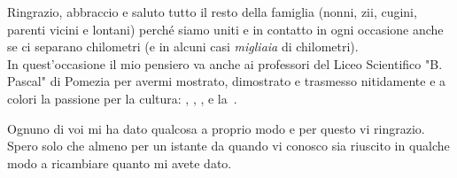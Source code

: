 Ringrazio, abbraccio e saluto tutto il resto della famiglia (nonni, zii, cugini, parenti vicini e lontani) perché siamo uniti e in contatto in ogni occasione anche se ci separano chilometri (e in alcuni casi \emph{migliaia} di chilometri).\\
In quest'occasione il mio pensiero va anche ai professori del Liceo Scientifico "B. Pascal" di Pomezia per avermi mostrato, dimostrato e trasmesso nitidamente e a colori la passione per la cultura: , , ,  e la~.

Ognuno di voi mi ha dato qualcosa a proprio modo e per questo vi ringrazio. Spero solo che almeno per un istante da quando vi conosco sia riuscito in qualche modo a ricambiare quanto mi avete dato.

\newpage
\mbox{}
\thispagestyle{empty}
